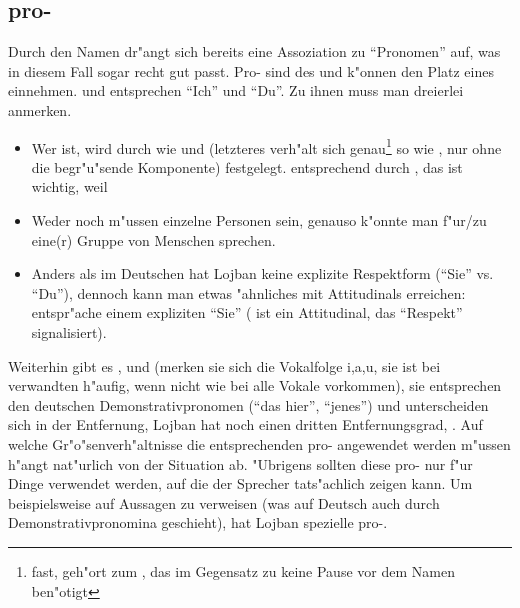 \subsection{pro-}
Durch den Namen dr"angt sich bereits eine Assoziation zu ``Pronomen'' auf, was in diesem Fall sogar recht gut passt. Pro- sind  des 
 und k"onnen den Platz eines  einnehmen.
 und  entsprechen ``Ich'' und ``Du''. Zu ihnen muss man dreierlei anmerken.
\begin{itemize}
\item Wer  ist, wird durch  wie  und  (letzteres verh"alt sich genau\footnote{fast,  geh"ort zum  , das
im Gegensatz zu  keine Pause vor dem Namen ben"otigt} so wie , nur ohne die begr"u"sende Komponente) festgelegt.  entsprechend durch , das
ist wichtig, weil
\item Weder  noch  m"ussen einzelne Personen sein, genauso k"onnte man f"ur/zu eine(r) Gruppe von Menschen sprechen.
\item Anders als im Deutschen hat Lojban keine explizite Respektform (``Sie'' vs. ``Du''), dennoch kann man etwas "ahnliches mit Attitudinals erreichen:  entspr"ache
einem expliziten ``Sie'' ( ist ein Attitudinal, das ``Respekt'' signalisiert).
\end{itemize}
Weiterhin gibt es ,  und  (merken sie sich die Vokalfolge i,a,u, sie ist bei verwandten  h"aufig, wenn nicht wie bei  alle Vokale
vorkommen), sie entsprechen den deutschen Demonstrativpronomen (``das hier'', ``jenes'') und unterscheiden sich in der Entfernung, Lojban hat noch einen dritten Entfernungsgrad, .
Auf welche Gr"o"senverh"altnisse die entsprechenden pro- angewendet werden m"ussen h"angt nat"urlich von der Situation ab. "Ubrigens sollten diese pro- nur
f"ur Dinge verwendet werden, auf die der Sprecher tats"achlich zeigen kann. Um beispielsweise auf Aussagen zu verweisen (was auf Deutsch auch durch Demonstrativpronomina geschieht),
hat Lojban spezielle pro-.


